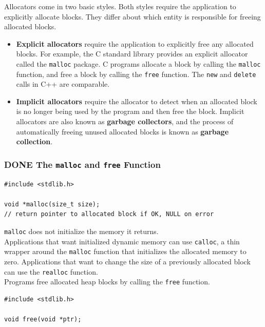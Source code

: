 \documentclass[11pt]{article}
\begin{document}
Allocators come in two basic styles. Both styles require the application to explicitly allocate blocks. They differ about which entity is responsible for freeing allocated blocks.\\
\begin{itemize}
\item \textbf{Explicit allocators} require the application to explicitly free any allocated blocks. For example, the C standard library provides an explicit allocator called the \texttt{malloc} package. C programs allocate a block by calling the \texttt{malloc} function, and free a block by calling the \texttt{free} function. The \texttt{new} and \texttt{delete} calls in C++ are comparable.\\
\item \textbf{Implicit allocators} require the allocator to detect when an allocated block is no longer being used by the program and then free the block. Implicit allocators are also known as \textbf{garbage collectors}, and the process of automatically freeing unused allocated blocks is known as \textbf{garbage collection}.\\
\end{itemize}


\subsubsection{{\bfseries\sffamily DONE} The \texttt{malloc} and \texttt{free} Function}
\label{sec:orge8720e2}
\begin{verbatim}
#include <stdlib.h>

void *malloc(size_t size);
// return pointer to allocated block if OK, NULL on error
\end{verbatim}

\texttt{malloc} does not initialize the memory it returns.\\
Applications that want initialized dynamic memory can use \texttt{calloc}, a thin wrapper around the \texttt{malloc} function that initializes the allocated memory to zero. Applications that want to change the size of a previously allocated block can use the \texttt{realloc} function.\\

Programs free allocated heap blocks by calling the \texttt{free} function.\\
\begin{verbatim}
#include <stdlib.h>

void free(void *ptr);
\end{verbatim}
\end{document}

